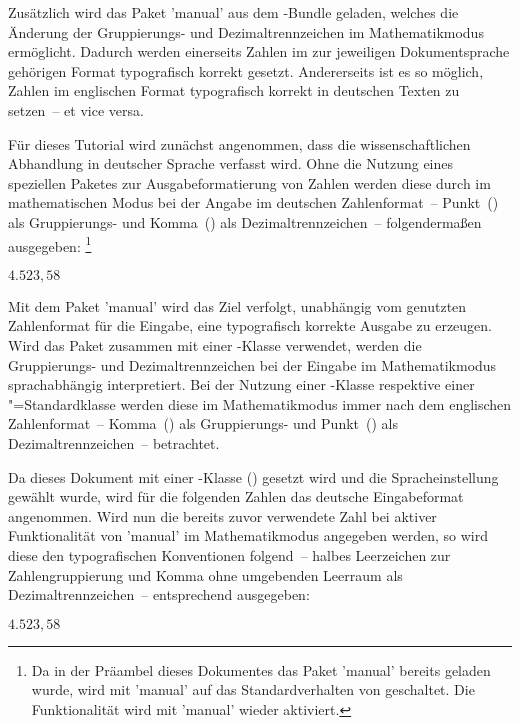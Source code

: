\documentclass[english,ngerman]{tudscrartcl}
\begin{document}
\begin{Bundle}{}
\begin{Preamble}
\end{Preamble}
%
Zusätzlich wird das Paket 'manual' aus dem \TUDScript-Bundle 
geladen, welches die Änderung der Gruppierungs- und Dezimaltrennzeichen im 
Mathematikmodus ermöglicht. Dadurch werden einerseits Zahlen im zur jeweiligen 
Dokumentsprache gehörigen Format typografisch korrekt gesetzt. Andererseits ist 
es so möglich, Zahlen im englischen Format typografisch korrekt in deutschen 
Texten zu setzen~-- et vice versa.
%
\begin{Preamble}
\usepackage{mathswap}
\end{Preamble}
%
%
Für dieses Tutorial wird zunächst angenommen, dass die wissenschaftlichen 
Abhandlung in deutscher Sprache verfasst wird. Ohne die Nutzung eines 
speziellen Paketes zur Ausgabeformatierung von Zahlen werden diese durch 
 im mathematischen Modus bei der Angabe im deutschen 
Zahlenformat~-- Punkt~() als Gruppierungs- und Komma~(\PValue{,}) als 
Dezimaltrennzeichen~-- folgendermaßen ausgegeben:%
\footnote{%
  Da in der Präambel dieses Dokumentes das Paket 'manual' 
  bereits geladen wurde, wird mit 'manual' auf das 
  Standardverhalten von  geschaltet. Die Funktionalität wird mit 
  'manual' wieder aktiviert.%
}
%
\begin{Trunk*}
\mathswapoff
\(4.523,58\)
\mathswapon

\end{Trunk*}
%
Mit dem Paket 'manual' wird das Ziel verfolgt, unabhängig vom 
genutzten Zahlenformat für die Eingabe, eine typografisch korrekte Ausgabe zu 
erzeugen. Wird das Paket zusammen mit einer \TUDScript-Klasse verwendet, werden 
die Gruppierungs- und Dezimaltrennzeichen bei der Eingabe im Mathematikmodus 
sprachabhängig interpretiert. Bei der Nutzung einer \KOMAScript-Klasse 
respektive einer "=Standardklasse werden diese im Mathematikmodus 
immer nach dem englischen Zahlenformat~-- Komma~(\PValue{,}) als Gruppierungs- 
und Punkt~(\PValue{,}) als Dezimaltrennzeichen~-- betrachtet.

Da dieses Dokument mit einer \TUDScript-Klasse (\TUDClassName) gesetzt wird und 
die Spracheinstellung~ gewählt wurde, wird für die folgenden 
Zahlen das deutsche Eingabeformat angenommen. Wird nun die bereits zuvor 
verwendete Zahl bei aktiver Funktionalität von 'manual' im 
Mathematikmodus angegeben werden, so wird diese den typografischen Konventionen 
folgend~-- halbes Leerzeichen zur Zahlengruppierung und Komma ohne umgebenden 
Leerraum als Dezimaltrennzeichen~-- entsprechend ausgegeben:
%
\begin{Trunk*}
\(4.523,58\)


\end{Trunk*}
\end{Bundle}
\end{document}
